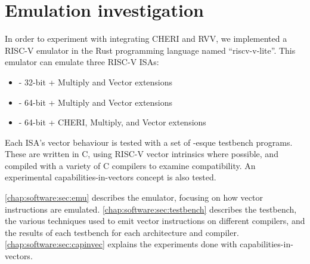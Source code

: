\chapter{Emulation investigation}
In order to experiment with integrating CHERI and RVV, we implemented a RISC-V emulator in the Rust programming language named \enquote{riscv-v-lite}.
This emulator can emulate three RISC-V ISAs: 
\begin{itemize}
    \item {} - 32-bit + Multiply and Vector extensions
    \item {} - 64-bit + Multiply and Vector extensions
    \item {} - 64-bit + CHERI, Multiply, and Vector extensions
\end{itemize}
Each ISA's vector behaviour is tested with a set of -esque testbench programs.
These are written in C, using RISC-V vector intrinsics where possible, and compiled with a variety of C compilers to examine compatibility.
An experimental capabilities-in-vectors concept is also tested.

\cref{chap:software:sec:emu} describes the emulator, focusing on how vector instructions are emulated.
\cref{chap:software:sec:testbench} describes the testbench, the various techniques used to emit vector instructions on different compilers, and the results of each testbench for each architecture and compiler.
\cref{chap:software:sec:capinvec} explains the experiments done with capabilities-in-vectors.



